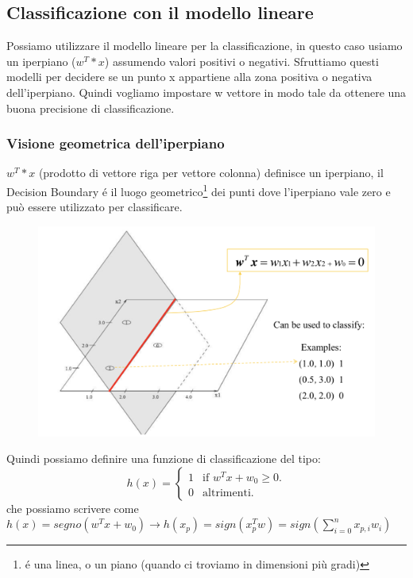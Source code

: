 \documentclass{article}
\begin{document}
\subsection{Classificazione con il modello lineare}
Possiamo utilizzare il modello lineare per la classificazione, in questo caso usiamo un iperpiano ($w^T*x$) assumendo valori positivi o negativi. Sfruttiamo questi modelli per decidere se un punto x appartiene alla zona positiva o negativa dell'iperpiano. Quindi vogliamo impostare w vettore in modo tale da ottenere una buona precisione di classificazione.

\subsubsection{Visione geometrica dell'iperpiano}
$w^T*x$ (prodotto di vettore riga per vettore colonna) definisce un iperpiano, il Decision Boundary é il luogo geometrico\footnote{é una linea, o un piano (quando ci troviamo in dimensioni più gradi)} dei punti dove l'iperpiano vale zero e può essere utilizzato per classificare.
\begin{figure}[H]
\centering
\includegraphics[scale=0.4]{Images/deecisionbundary.png}
\end{figure}
Quindi possiamo definire una funzione di classificazione del tipo:
\begin{equation}
  h(x)=\begin{cases}
    1 & \text{if $w^Tx+w_0\geq 0$}.\\
    0 & \text{altrimenti}.
  \end{cases}
\end{equation}
che possiamo scrivere come $h(x)=segno(w^Tx+w_0) \rightarrow h(x_p)=sign(x_p^Tw)=sign(\sum_{i=0}^n x_{p,i}w_i)$
\end{document}

